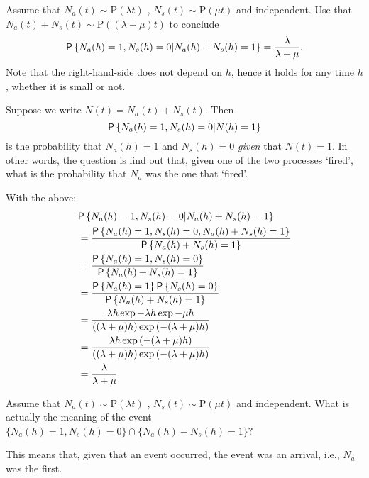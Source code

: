 \begin{question} Assume that
  $N_a(t)\sim \text{P}(\lambda t)$ , $N_s(t) \sim \text{P}(\mu t)$ and
  independent. Use that  $N_a(t) + N_s(t) \sim \text{P}((\lambda + \mu)t)$ to conclude
    \begin{equation*}
    \P{N_a(h) = 1,  N_s(h) = 0 | N_a(h) + N_s(h) = 1} =
\frac{\lambda}{\lambda+\mu}.
    \end{equation*}
    Note that the right-hand-side does not depend on $h$, hence it
    holds for any time $h$, whether it is small or not.  
    \begin{hint}
Suppose
      we write $N(t)=N_a(t) + N_s(t)$. Then
      \begin{equation*}
      \P{N_a(h) = 1, N_s(h) = 0 | N(h) = 1}
      \end{equation*}
      is the probability that $N_a(h)=1$ and $N_s(h)=0$ \emph{given}
      that $N(t)=1$. In other words, the question is find out that,
      given one of the two processes `fired', what is the probability
      that $N_a$ was the one that `fired'.
    \end{hint}

    \begin{solution}
  With the above:
  \begin{equation*}
    \begin{split}
&    \P{N_a(h) = 1,  N_s(h) = 0 | N_a(h) + N_s(h) = 1} \\
&= \frac{\P{N_a(h) = 1,  N_s(h) = 0, N_a(h) + N_s(h) = 1} }{ \P{N_a(h) + N_s(h) = 1}} \\ 
&= \frac{\P{N_a(h) = 1,  N_s(h) = 0}}{ \P{N_a(h) + N_s(h) = 1}} \\ 
&= \frac{\P{N_a(h) = 1}\P{N_s(h) = 0}}{ \P{N_a(h) + N_s(h) = 1}} \\ 
&= \frac{\lambda h \exp{-\lambda h} \exp{-\mu h}}{((\lambda+\mu)h)\exp{(-(\lambda+\mu)h)}}\\
&= \frac{\lambda h \exp{(-(\lambda + \mu)h)}}{((\lambda+\mu)h)\exp{(-(\lambda+\mu)h)}}\\
&= \frac{\lambda}{\lambda+\mu}
    \end{split}
  \end{equation*}
    \end{solution}
\end{question}


\begin{question}
 Assume that $N_a(t)\sim \text{P}(\lambda t)$ ,
  $N_s(t) \sim \text{P}(\mu t)$ and independent.  What is actually the
  meaning of the event
  $\{N_a(h) = 1, N_s(h) = 0\}\cap\{N_a(h) + N_s(h) = 1\}$?
    \begin{solution}
 This means that, given that an event occurred, the event was an arrival, i.e., $N_a$ was the first.
    \end{solution}
\end{question}

